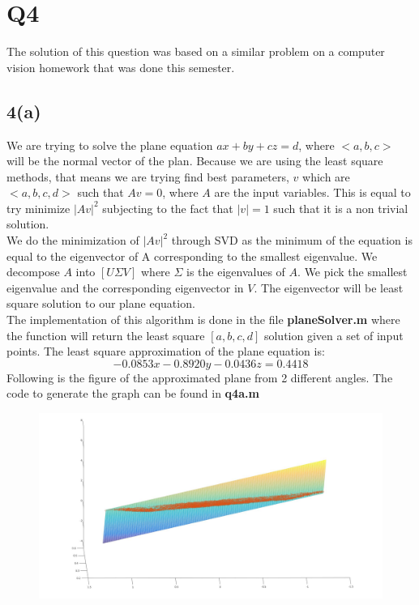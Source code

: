 \documentclass{article}
\begin{document}
\section{Q4}
The solution of this question was based on a similar problem on a computer vision homework that was done this semester.
\subsection*{4(a)}
We are trying to solve the plane equation $ax +by + cz = d$, where $<a,b,c>$ will be the normal vector of the plan. Because we are using the least square methods, that means we are trying find best parameters, $v$ which are $<a,b,c,d>$ such that $Av = 0$, where $A$ are the input variables. This is equal to try minimize $|Av|^2$ subjecting to the fact that $|v| = 1$ such that it is a non trivial solution.\\
We do the minimization of $|Av|^2$ through SVD as the minimum of the equation is equal to the eigenvector of A corresponding to the smallest eigenvalue. We decompose $A$ into $[U \Sigma V]$ where $\Sigma$ is the eigenvalues of $A$. We pick the smallest eigenvalue and the corresponding eigenvector in $V$. The eigenvector will be least square solution to our plane equation.\\
The implementation of this algorithm is done in the file \textbf{planeSolver.m} where the function will return the least square $[a,b,c,d]$ solution given a set of input points. The least square approximation of the plane equation is:
\begin{equation*}
-0.0853x - 0.8920y - 0.0436z = 0.4418
\end{equation*}
Following is the figure of the approximated plane from 2 different angles. The code to generate the graph can be found in \textbf{q4a.m}
\begin{figure}[H]
\centering
\includegraphics[width=5in]{figures/q4a_1.jpg}
\end{figure}
\end{document}
